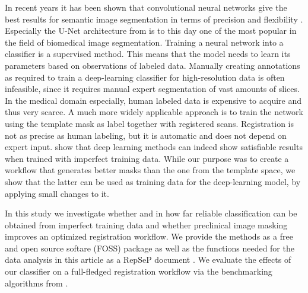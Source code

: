 In recent years it has been shown that convolutional neural networks give the best results for semantic image segmentation in terms of precision and flexibility \cite{geng_survey_2018}.
Especially the U-Net architecture from \cite{ronneberger_u-net:_2015} is to this day one of the most popular in the field of biomedical image segmentation.
Training a neural network into a classifier is a supervised method.
This means that the model needs to learn its parameters based on observations of labeled data.
Manually creating annotations as required to train a deep-learning classifier for high-resolution data is often infeasible, since it requires manual expert segmentation of vast amounts of slices.
In the medical domain especially, human labeled data is expensive to acquire and thus very scarce.
A much more widely applicable approach is to train the network using the template mask as label together with registered scans.
Registration is not as precise as human labeling, but it is automatic and does not depend on expert input.
\cite{imperfect_datasets, imperferct_segmentaion_labels} show that deep learning methods can indeed show satisfiable results when trained with imperfect training data.
While our purpose was to create a workflow that generates better masks than the one from the template space, we show that the latter can be used as training data for the deep-learning model, by applying small changes to it.


In this study we investigate whether and in how far reliable classification can be obtained from imperfect training data and whether preclinical image masking improves an optimized registration workflow.
We provide the methods as a free and open source softare (FOSS) package \cite{mlebe} as well as the functions needed for the data analysis in this article as a RepSeP document \cite{repsep}.
We evaluate the effects of our classifier on a full-fledged registration workflow via the benchmarking algorithms from \cite{ioanas_optimized_2019}.